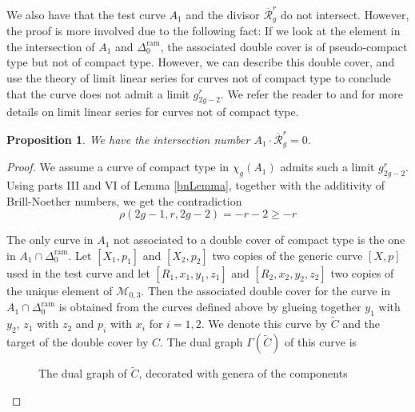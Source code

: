 \documentclass{article}
\theoremstyle{plain}
\newtheorem{prop}[trm]{Proposition}
\theoremstyle{definition}
\def\rr{\overline{\mathcal{R}}}
\begin{document}
We also have that the test curve $A_1$ and the divisor $\rr^r_g$ do not intersect. However, the proof is more involved due to the following fact: If we look at the element in the intersection of $A_1$ and $\Delta_0^{\mathrm{ram}}$, the associated double cover is of pseudo-compact type but not of compact type. However, we can describe this double cover, and use the theory of limit linear series for curves not of compact type to conclude that the curve does not admit a limit $g^r_{2g-2}$. We refer the reader to \cite{Ossermandim} and \cite{Ossermancompacttype} for more details on limit linear series for curves not of compact type.
\begin{prop} \label{testA_1}
	We have the intersection number $A_1\cdot \rr_g^r = 0$.
\end{prop}
\begin{proof}
		We assume a curve of compact type in $\chi_g(A_1)$ admits such a limit $g^r_{2g-2}$. Using parts III and VI of Lemma \ref{bnLemma}, together with the additivity of Brill-Noether numbers, we get the contradiction 
	\[ \rho(2g-1,r,2g-2) = -r-2 \geq -r \]
	
The only curve in $A_1$ not associated to a double cover of compact type is the one in $A_1\cap \Delta_0^{\mathrm{ram}}$. Let $[X_1, p_1]$ and $[X_2, p_2]$ two copies of the generic curve $[X,p]$ used in the test curve and let $[R_1, x_1, y_1,z_1]$ and $[R_2, x_2,y_2,z_2]$ two copies of the unique element of $\mathcal{M}_{0,3}$. Then the associated double cover for the curve in $A_1\cap \Delta_0^{\mathrm{ram}}$ is obtained from the curves defined above by glueing together $y_1$ with $y_2$, $z_1$ with $z_2$ and $p_i$ with $x_i$ for $i=1,2$. We denote this curve by $\widetilde{C}$ and the target of the double cover by $C$. The dual graph $\Gamma(\widetilde{C})$ of this curve is 
\begin{figure}[H] \centering
{} \caption{The dual graph of $\widetilde{C}$, decorated with genera of the components}
\end{figure} 


\end{proof}
\end{document}
